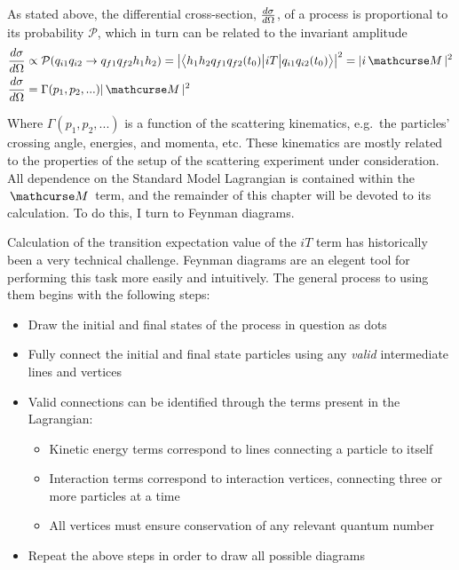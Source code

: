     As stated above, the differential cross-section, $\frac{d\sigma}{d\Omega}$,
        of a process is proportional to its probability $\mathcal{P}$,
        which in turn can be related to the invariant amplitude
    \begin{equation} \begin{split}
        \dXsec &\propto \mathcal{P}( q_{i1} q_{i2} \rightarrow q_{f1} q_{f2} h_1 h_2 ) 
            = \left| \TbraketA{ h_1 h_2 q_{f1} q_{f2} (t_0)}{iT}{q_{i1} q_{i2} (t_0)} \right|^2 
            = |i \invAmp|^2 
        \\\dXsec &= \Gamma(p_1, p_2, ...) |\invAmp|^2
    \end{split} \end{equation}

    Where $\Gamma(p_1, p_2, ...)$ is a function of the scattering kinematics,
        e.g.\ the particles' crossing angle, energies, and momenta, etc.
    These kinematics are mostly related to the properties of the setup of the scattering experiment under consideration.
    All dependence on the Standard Model Lagrangian is contained within the $\invAmp$ term,
        and the remainder of this chapter will be devoted to its calculation.
    To do this, I turn to Feynman diagrams.

    Calculation of the transition expectation value of the $iT$ term has historically been a very technical challenge.
    Feynman diagrams are an elegent tool for performing this task more easily and intuitively.
    The general process to using them begins with the following steps:
    \begin{itemize}
        \item Draw the initial and final states of the process in question as dots
        \item Fully connect the initial and final state particles using any \textit{valid} intermediate lines and vertices
        \item Valid connections can be identified through the terms present in the Lagrangian:
        \begin{itemize}
            \item Kinetic energy terms correspond to lines connecting a particle to itself
            \item Interaction terms correspond to interaction vertices, connecting three or more particles at a time
            \item All vertices must ensure conservation of any relevant quantum number
        \end{itemize}
        \item Repeat the above steps in order to draw all possible diagrams
    \end{itemize}

